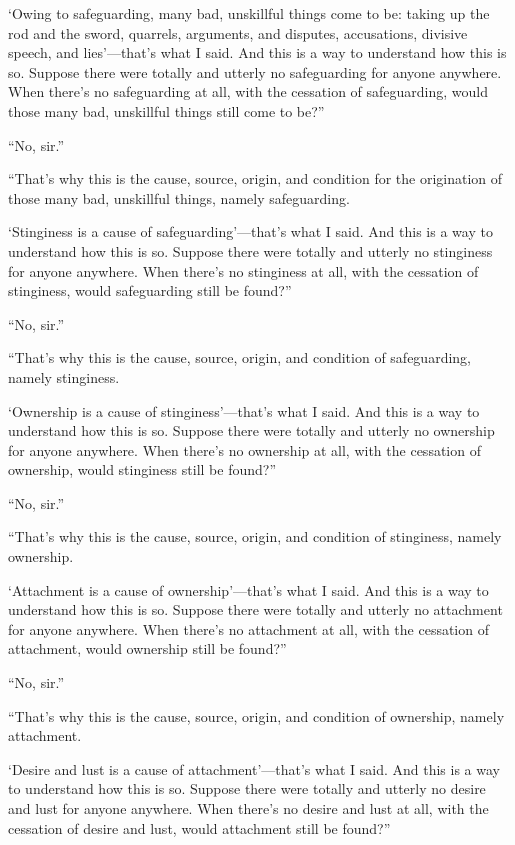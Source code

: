 \documentclass[12pt,openany]{book}%
\begin{document}
‘Owing to safeguarding, many bad, unskillful things come to be: taking up the rod and the sword, quarrels, arguments, and disputes, accusations, divisive speech, and lies’—that’s what I said. And this is a way to understand how this is so. Suppose there were totally and utterly no safeguarding for anyone anywhere. When there’s no safeguarding at all, with the cessation of safeguarding, would those many bad, unskillful things still come to be?” 

“No, sir.” 

“That’s why this is the cause, source, origin, and condition for the origination of those many bad, unskillful things, namely safeguarding. 

‘Stinginess is a cause of safeguarding’—that’s what I said. And this is a way to understand how this is so. Suppose there were totally and utterly no stinginess for anyone anywhere. When there’s no stinginess at all, with the cessation of stinginess, would safeguarding still be found?” 

“No, sir.” 

“That’s why this is the cause, source, origin, and condition of safeguarding, namely stinginess. 

‘Ownership is a cause of stinginess’—that’s what I said. And this is a way to understand how this is so. Suppose there were totally and utterly no ownership for anyone anywhere. When there’s no ownership at all, with the cessation of ownership, would stinginess still be found?” 

“No, sir.” 

“That’s why this is the cause, source, origin, and condition of stinginess, namely ownership. 

‘Attachment is a cause of ownership’—that’s what I said. And this is a way to understand how this is so. Suppose there were totally and utterly no attachment for anyone anywhere. When there’s no attachment at all, with the cessation of attachment, would ownership still be found?” 

“No, sir.” 

“That’s why this is the cause, source, origin, and condition of ownership, namely attachment. 

‘Desire and lust is a cause of attachment’—that’s what I said. And this is a way to understand how this is so. Suppose there were totally and utterly no desire and lust for anyone anywhere. When there’s no desire and lust at all, with the cessation of desire and lust, would attachment still be found?” 
\end{document}
